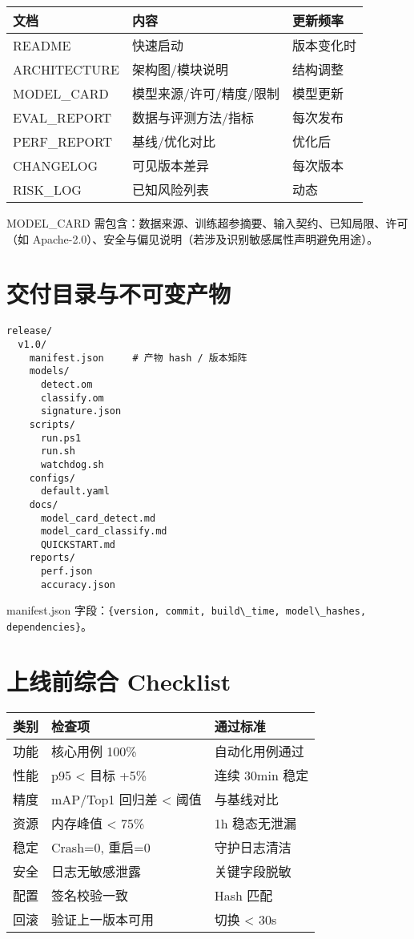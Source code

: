 \begin{longtable}[]{@{}lll@{}}
\toprule\noalign{}
文档 & 内容 & 更新频率 \\
\midrule\noalign{}
\endhead
\bottomrule\noalign{}
\endlastfoot
README & 快速启动 & 版本变化时 \\
ARCHITECTURE & 架构图/模块说明 & 结构调整 \\
MODEL\_CARD & 模型来源/许可/精度/限制 & 模型更新 \\
EVAL\_REPORT & 数据与评测方法/指标 & 每次发布 \\
PERF\_REPORT & 基线/优化对比 & 优化后 \\
CHANGELOG & 可见版本差异 & 每次版本 \\
RISK\_LOG & 已知风险列表 & 动态 \\
\end{longtable}

MODEL\_CARD 需包含：数据来源、训练超参摘要、输入契约、已知局限、许可（如
Apache-2.0）、安全与偏见说明（若涉及识别敏感属性声明避免用途）。

\section{交付目录与不可变产物}\label{ux4ea4ux4ed8ux76eeux5f55ux4e0eux4e0dux53efux53d8ux4ea7ux7269}

\begin{lstlisting}
release/
  v1.0/
    manifest.json     # 产物 hash / 版本矩阵
    models/
      detect.om
      classify.om
      signature.json
    scripts/
      run.ps1
      run.sh
      watchdog.sh
    configs/
      default.yaml
    docs/
      model_card_detect.md
      model_card_classify.md
      QUICKSTART.md
    reports/
      perf.json
      accuracy.json
\end{lstlisting}

manifest.json
字段：\passthrough{\lstinline!\{version, commit, build\_time, model\_hashes, dependencies\}!}。

\section{上线前综合
Checklist}\label{ux4e0aux7ebfux524dux7efcux5408-checklist}

\begin{longtable}[]{@{}lll@{}}
\toprule\noalign{}
类别 & 检查项 & 通过标准 \\
\midrule\noalign{}
\endhead
\bottomrule\noalign{}
\endlastfoot
功能 & 核心用例 100\% & 自动化用例通过 \\
性能 & p95 \textless{} 目标 +5\% & 连续 30min 稳定 \\
精度 & mAP/Top1 回归差 \textless{} 阈值 & 与基线对比 \\
资源 & 内存峰值 \textless{} 75\% & 1h 稳态无泄漏 \\
稳定 & Crash=0, 重启=0 & 守护日志清洁 \\
安全 & 日志无敏感泄露 & 关键字段脱敏 \\
配置 & 签名校验一致 & Hash 匹配 \\
回滚 & 验证上一版本可用 & 切换 \textless{} 30s \\
\end{longtable}

